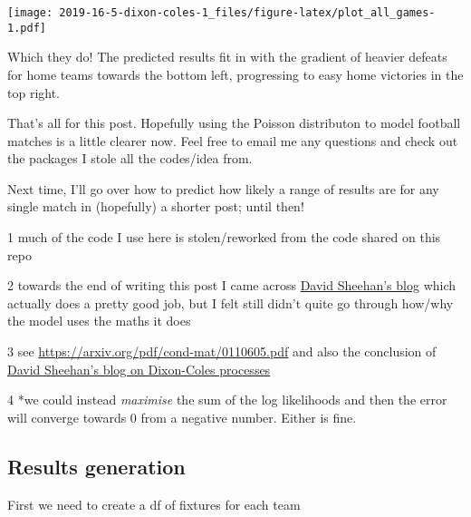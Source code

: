 \documentclass[]{article}
\begin{document}
\texttt{[image: 2019-16-5-dixon-coles-1\_files/figure-latex/plot\_all\_games-1.pdf]}

Which they do! The predicted results fit in with the gradient of heavier
defeats for home teams towards the bottom left, progressing to easy home
victories in the top right.

That's all for this post. Hopefully using the Poisson distributon to
model football matches is a little clearer now. Feel free to email me
any questions and check out the packages I stole all the codes/idea
from.

Next time, I'll go over how to predict how likely a range of results are
for any single match in (hopefully) a shorter post; until then!

1 much of the code I use here is stolen/reworked from the code shared on
this repo

2 towards the end of writing this post I came across
\href{https://dashee87.github.io/football/python/predicting-football-results-with-statistical-modelling-dixon-coles-and-time-weighting/}{David
Sheehan's blog} which actually does a pretty good job, but I felt still
didn't quite go through how/why the model uses the maths it does

3 see \url{https://arxiv.org/pdf/cond-mat/0110605.pdf} and also the
conclusion of
\href{https://dashee87.github.io/football/python/predicting-football-results-with-statistical-modelling/}{David
Sheehan's blog on Dixon-Coles processes}

4 *we could instead \emph{maximise} the sum of the log likelihoods and
then the error will converge towards 0 from a negative number. Either is
fine.

\subsection{Results generation}\label{results-generation}

First we need to create a df of fixtures for each team
\end{document}
